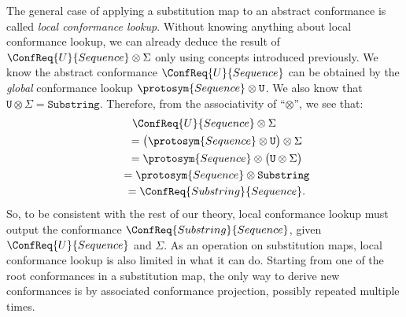 \documentclass[../generics]{subfiles}
\begin{document}
The general case of applying a substitution map to an abstract conformance is called \emph{local conformance lookup}. Without knowing anything about local conformance lookup, we can already deduce the result of $\ConfReq{U}{Sequence}\otimes \Sigma$ only using concepts introduced previously. We know the abstract conformance $\ConfReq{U}{Sequence}$ can be obtained by the \emph{global} conformance lookup $\protosym{Sequence}\otimes\texttt{U}$. We also know that $\texttt{U}\otimes \Sigma=\texttt{Substring}$. Therefore, from the associativity of ``$\otimes$'', we see that:
\begin{gather*}
\ConfReq{U}{Sequence}\otimes \Sigma\\
\qquad {} = \bigl(\protosym{Sequence}\otimes\texttt{U}\bigr)\otimes \Sigma\\
\qquad {} = \protosym{Sequence}\otimes\bigl(\texttt{U}\otimes \Sigma\bigr)\\
\qquad {} = \protosym{Sequence}\otimes\texttt{Substring}\\
\qquad {} = \ConfReq{Substring}{Sequence}.
\end{gather*}
So, to be consistent with the rest of our theory, local conformance lookup must output the conformance $\ConfReq{Substring}{Sequence}$, given $\ConfReq{U}{Sequence}$ and $\Sigma$. As an operation on substitution maps, local conformance lookup is also limited in what it can do. Starting from one of the root conformances in a substitution map, the only way to derive new conformances is by associated conformance projection, possibly repeated multiple times.
\end{document}
